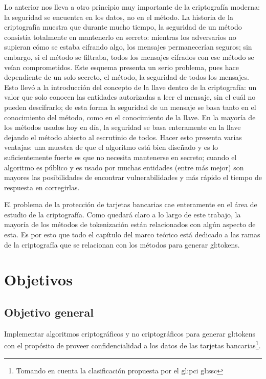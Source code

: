 Lo anterior nos lleva a otro principio muy importante de la criptografía
moderna: la seguridad se encuentra en los datos, no en el método. La historia
de la criptografía muestra que durante mucho tiempo, la seguridad de un método
consistía totalmente en mantenerlo en secreto: mientras los adversarios
no supieran cómo se estaba cifrando algo, los mensajes permanecerían seguros;
sin embargo, si el método se filtraba, todos los mensajes cifrados con ese
método se veían comprometidos. Este esquema presenta un serio problema,
pues hace dependiente de un solo secreto, el método, la seguridad de todos
los mensajes. Esto llevó a la introducción del concepto de la llave dentro
de la criptografía: un valor que solo conocen las entidades autorizadas a leer
el mensaje, sin el cuál no pueden descifrarlo; de esta forma la seguridad de un
mensaje se basa tanto en el conocimiento del método, como en el conocimiento
de la llave. En la mayoría de los métodos usados hoy en día, la seguridad se
basa enteramente en la llave dejando el método abierto al escrutinio de todos.
Hacer esto presenta varias ventajas: una muestra de que el algoritmo está
bien diseñado y es lo suficientemente fuerte es que no necesita mantenerse en
secreto; cuando el algoritmo es público y es usado por muchas entidades (entre
más mejor) son mayores las posibilidades de encontrar vulnerabilidades y
más rápido el tiempo de respuesta en corregirlas.

El problema de la protección de tarjetas bancarias cae enteramente en el
área de estudio de la criptografía. Como quedará claro a lo largo de este
trabajo, la mayoría de los métodos de tokenización están relacionados
con algún aspecto de esta. Es por esto que todo el capítulo
del marco teórico está dedicado a las ramas de la criptografía que se
relacionan con los métodos para generar \glspl{gl:token}.

\section{Objetivos}

\subsection{Objetivo general}

Implementar algoritmos criptográficos y no criptográficos para generar
\glspl{gl:token} con el propósito de proveer confidencialidad a los datos de las
tarjetas bancarias\footnote{Tomando en cuenta la clasificación propuesta por el
\gls{gl:pci} \gls{gl:ssc}}.

